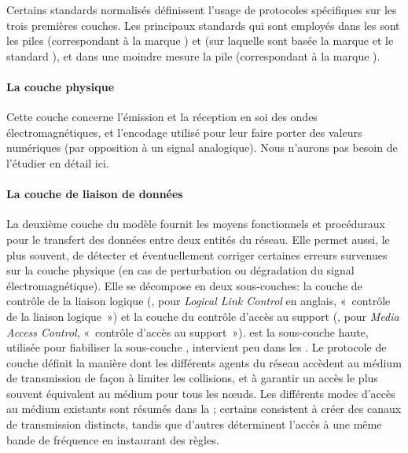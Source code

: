 Certains standards normalisés définissent l'usage de protocoles spécifiques sur les trois premières couches.
Les principaux standards qui sont employés dans les \rcs sont les piles \ieeee (correspondant à la marque \wifi) et \ieeeff (sur laquelle sont basée la marque \zigbee et le standard \ietf \slowpan), et dans une moindre mesure la pile \ieeefo (correspondant à la marque \bluetooth).

            \paragraph{La couche physique}
Cette couche concerne l'émission et la réception en soi des ondes électromagnétiques, et l'encodage utilisé pour leur faire porter des valeurs numériques (par opposition à un signal analogique).
Nous n'aurons pas besoin de l'étudier en détail ici.

\paragraph{La couche de liaison de données}\label{st:ssec:mac}
La deuxième couche du modèle fournit les moyens fonctionnels et procéduraux pour le transfert des données entre deux entités du réseau.
Elle permet aussi, le plus souvent, de détecter et éventuellement corriger certaines erreurs survenues sur la couche physique (en cas de perturbation ou dégradation du signal électromagnétique).
Elle se décompose en deux sous-couches: la couche de contrôle de la liaison logique (\llc, pour \textit{Logical Link Control} en anglais, « contrôle de la liaison logique ») et la couche du contrôle d'accès au support (\mac, pour \textit{Media Access Control}, « contrôle d'accès au support »).
\llc est la sous-couche haute, utilisée pour fiabiliser la sous-couche \mac, intervient peu dans les \rcs.
Le protocole de couche \mac définit la manière dont les différents agents du réseau accèdent au médium de transmission de façon à limiter les collisions, et à garantir un accès le plus souvent équivalent au médium pour tous les nœuds.
Les différents modes d'accès au médium existants sont résumés dans la ; certains consistent à créer des canaux de transmission distincts, tandis que d'autres déterminent l'accès à une même bande de fréquence en instaurant des règles.

